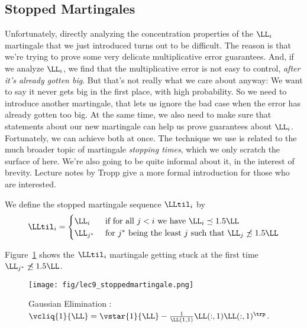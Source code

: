 \subsection{Stopped Martingales}
Unfortunately, directly analyzing the concentration properties of
the $\LL_i$ martingale that we just introduced turns out to be
difficult.
The reason is that we're trying to prove some very delicate
multiplicative error guarantees.
And, if we analyze $\LL_i$, we find that the multiplicative error is
not easy to control, \emph{after it's already gotten big}.
But that's not really what we care about anyway: We want to say it
never gets big in the first place, with high probability.
So we need to introduce another martingale, that lets us ignore the
bad case when the error has already gotten too big.
At the same time, we also need to make sure that statements about our
new martingale can help us prove guarantees about  $\LL_i$.
Fortunately, we can achieve both at once.
The technique we use is related to the much broader topic of
martingale \emph{stopping times}, which we only scratch the surface of
here. We're also going to be quite informal about it, in the interest
of brevity.
Lecture notes by Tropp \cite{tropp19} give a more formal introduction for
those who are interested.



We define the stopped martingale sequence $\LLtil_i$ by
\begin{equation}
  \label{eq:stoppedmartingale}
  \LLtil_i
  =
  \begin{cases}
    \LL_i & \text{ if for all } j < i \text{ we have }
       \LL_i \preceq 1.5 \LL
       \\
    \LL_{j^*} & \text{ for } j^* \text{ being the least $j$ such that }  \LL_{j} \not\preceq 1.5 \LL
  \end{cases}
\end{equation}



Figure~\ref{fig:stopmart} shows the $\LLtil_i$ martingale getting
stuck at the first time $\LL_{j^*} \not\preceq 1.5 \LL$.
\begin{figure}[H]
  \centering
  \texttt{[image: fig/lec9\_stoppedmartingale.png]}
  \caption{Gaussian Elimination
    :
    $\vcliq{1}{\LL} = \vstar{1}{\LL} - \frac{1}{\LL(1,1)} \LL(:,1)
    \LL(:,1)^{\trp}$.}
      \label{fig:stopmart}
    \end{figure}

